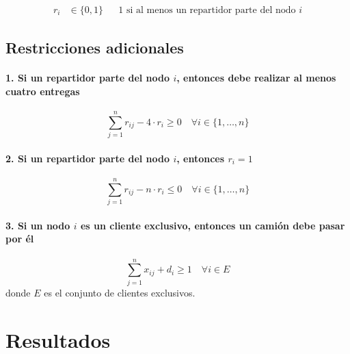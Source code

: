 \documentclass{article}
\begin{document}
\begin{align*}
    r_{i} &\in \{0,1\} && \text{1 si al menos un repartidor parte del nodo } i 
\end{align*}

\subsection*{Restricciones adicionales}

\paragraph{1. Si un repartidor parte del nodo $i$, entonces debe realizar al menos cuatro entregas}
\[
\sum_{j=1}^{n} r_{ij} - 4 \cdot r_{i} \geq 0 \quad \forall i \in \{1, \dots, n\}
\]

\paragraph{2. Si un repartidor parte del nodo $i$, entonces $r_i = 1$}
\[
\sum_{j=1}^{n} r_{ij} - n \cdot r_{i} \leq 0 \quad \forall i \in \{1, \dots, n\}
\]

\paragraph{3. Si un nodo $i$ es un cliente exclusivo, entonces un camión debe pasar por él}
\[
\sum_{j=1}^{n} x_{ij} + d_{i} \geq 1 \quad \forall i \in E
\]
donde $E$ es el conjunto de clientes exclusivos.


\section{Resultados}
\end{document}
